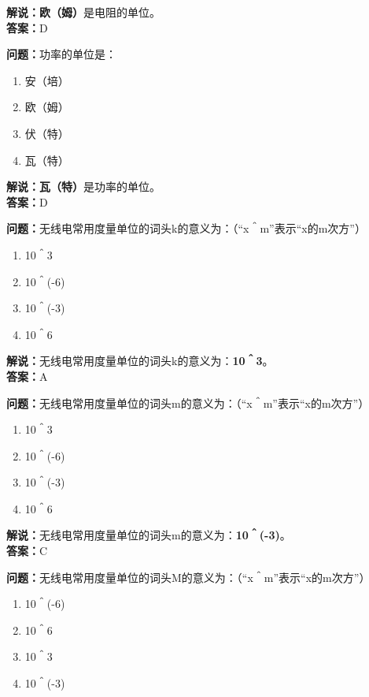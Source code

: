 \documentclass{ctexbook}
\begin{document}
\noindent\textbf{解说：欧（姆）}是电阻的单位。\\\noindent\textbf{答案：}D


\bigskip


\noindent\textbf{问题：}功率的单位是：

\begin{enumerate}[label=\Alph*), leftmargin=3em]
	\item 安（培）
	\item 欧（姆）
	\item 伏（特）
	\item 瓦（特）
\end{enumerate}

\noindent\textbf{解说：瓦（特）}是功率的单位。\\\noindent\textbf{答案：}D


\bigskip


\noindent\textbf{问题：}无线电常用度量单位的词头k的意义为：（“x＾m”表示“x的m次方”）

\begin{enumerate}[label=\Alph*), leftmargin=3em]
	\item 10＾3
	\item 10＾(-6)
	\item 10＾(-3)
	\item 10＾6
\end{enumerate}

\noindent\textbf{解说：}无线电常用度量单位的词头k的意义为：\textbf{10＾3}。\\\noindent\textbf{答案：}A


\bigskip


\noindent\textbf{问题：}无线电常用度量单位的词头m的意义为：（“x＾m”表示“x的m次方”）

\begin{enumerate}[label=\Alph*), leftmargin=3em]
	\item 10＾3
	\item 10＾(-6)
	\item 10＾(-3)
	\item 10＾6
\end{enumerate}

\noindent\textbf{解说：}无线电常用度量单位的词头m的意义为：\textbf{10＾(-3)}。\\\noindent\textbf{答案：}C


\bigskip


\noindent\textbf{问题：}无线电常用度量单位的词头M的意义为：（“x＾m”表示“x的m次方”）

\begin{enumerate}[label=\Alph*), leftmargin=3em]
	\item 10＾(-6)
	\item 10＾6
	\item 10＾3
	\item 10＾(-3)
\end{enumerate}
\end{document}
